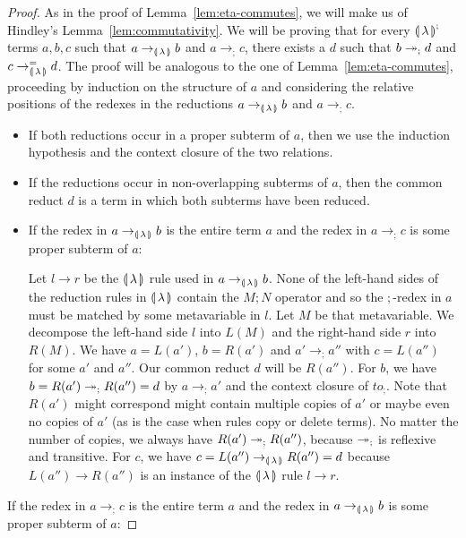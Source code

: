 \begin{proof}
  As in the proof of Lemma~\ref{lem:eta-commutes}, we will make us of
  Hindley's Lemma~\ref{lem:commutativity}. We will be proving that for
  every ${\llparenthesis \, \lambda \, \rrparenthesis}^;$ terms $a,b,c$ such that $a \to_{\llparenthesis \, \lambda \, \rrparenthesis} b$ and $a \to_; c$,
  there exists a $d$ such that $b \twoheadrightarrow_; d$ and $c \to_{\llparenthesis \, \lambda \, \rrparenthesis}^= d$. The
  proof will be analogous to the one of Lemma~\ref{lem:eta-commutes},
  proceeding by induction on the structure of $a$ and considering the
  relative positions of the redexes in the reductions $a \to_{\llparenthesis \, \lambda \, \rrparenthesis} b$ and
  $a \to_; c$.

  \begin{itemize}
  \item If both reductions occur in a proper subterm of $a$, then we use
    the induction hypothesis and the context closure of the two relations.

  \item If the reductions occur in non-overlapping subterms of $a$, then
    the common reduct $d$ is a term in which both subterms have been
    reduced.

  \item If the redex in $a \to_{\llparenthesis \, \lambda \, \rrparenthesis} b$ is the entire term $a$ and the
    redex in $a \to_; c$ is some proper subterm of $a$:

    Let $l \to r$ be the ${\llparenthesis \, \lambda \, \rrparenthesis}$ rule used in $a \to_{\llparenthesis \, \lambda \, \rrparenthesis} b$. None of the
    left-hand sides of the reduction rules in ${\llparenthesis \, \lambda \, \rrparenthesis}$ contain the $M; N$
    operator and so the $;$-redex in $a$ must be matched by some
    metavariable in $l$. Let $M$ be that metavariable. We decompose the
    left-hand side $l$ into $L(M)$ and the right-hand side $r$ into
    $R(M)$. We have $a = L(a')$, $b = R(a')$ and $a' \to_; a''$ with
    $c = L(a'')$ for some $a'$ and $a''$. Our common reduct $d$ will be
    $R(a'')$. For $b$, we have $b = R(a') \twoheadrightarrow_; R(a'') = d$ by
    $a \to_; a'$ and the context closure of $to_;$. Note that $R(a')$ might
    correspond might contain multiple copies of $a'$ or maybe even no
    copies of $a'$ (as is the case when rules copy or delete terms). No
    matter the number of copies, we always have $R(a') \twoheadrightarrow_; R(a'')$,
    because $\twoheadrightarrow_;$ is reflexive and transitive. For $c$, we have
    $c = L(a'') \to_{\llparenthesis \, \lambda \, \rrparenthesis} R(a'') = d$ because $L(a'') \to R(a'')$ is an
    instance of the ${\llparenthesis \, \lambda \, \rrparenthesis}$ rule $l \to r$.
  \end{itemize}

  \item If the redex in $a \to_; c$ is the entire term $a$ and the redex in
    $a \to_{\llparenthesis \, \lambda \, \rrparenthesis} b$ is some proper subterm of $a$:


\end{proof}
